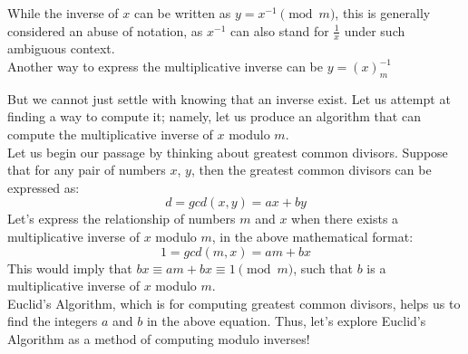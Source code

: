 While the inverse of $x$ can be written as $y = x^{-1}\pmod{m}$, this is generally considered an abuse of notation, as $x^{-1}$ can also stand for $\frac{1}{x}$ under such ambiguous context. \\
Another way to express the multiplicative inverse can be $y = (x)_{m}^{-1}$

But we cannot just settle with knowing that an inverse exist. Let us attempt at finding a way to compute it; namely, let us produce an algorithm that can compute the multiplicative inverse of $x$ modulo $m$. \\
Let us begin our passage by thinking about greatest common divisors. Suppose that for any pair of numbers $x$, $y$, then the greatest common divisors can be expressed as:
\[d = gcd(x, y) = ax + by\]
Let's express the relationship of numbers $m$ and $x$ when there exists a multiplicative inverse of $x$ modulo $m$, in the above mathematical format:
\[1 = gcd(m, x) = am + bx\]
This would imply that $bx \equiv am + bx \equiv 1\pmod{m}$, such that $b$ is a multiplicative inverse of $x$ modulo $m$. \\
Euclid's Algorithm, which is for computing greatest common divisors, helps us to find the integers $a$ and $b$ in the above equation. Thus, let's explore Euclid's Algorithm as a method of computing modulo inverses!

